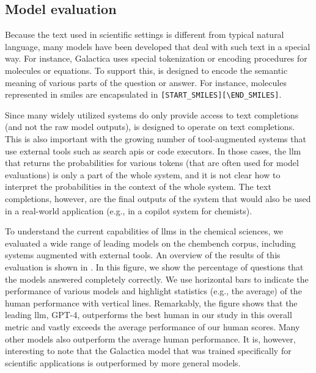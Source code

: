 \documentclass[11pt, oneside]{article}
\begin{document}
\begin{refsection}
\subsection{Model evaluation}

Because the text used in scientific settings is different from typical natural language, many models have been developed that deal with such text in a special way.
For instance, Galactica\autocite{taylor2022galactica} uses special tokenization or encoding procedures for molecules or equations.
To support this, \chembench is designed to encode the semantic meaning of various parts of the question or answer.  
For instance, molecules represented in \gls{smiles} are encapsulated in \texttt{[START\_SMILES][\textbackslash END\_SMILES]}.

Since many widely utilized systems do only provide access to text completions (and not the raw model outputs), \chembench is designed to operate on text completions.
This is also important with the growing number of tool-augmented systems that use external tools such as search \glspl{api} or code executors.\autocite{schick2024toolformer, karpas2022mrkl, yao2022react}
In those cases, the \gls{llm} that returns the probabilities for various tokens (that are often used for model evaluations\autocite{Fourrier_Habib_Launay_Wolf}) is only a part of the whole system, and it is not clear how to interpret the probabilities in the context of the whole system.
The text completions, however, are the final outputs of the system that would also be used in a real-world application (e.g., in a copilot system for chemists).

To understand the current capabilities of \glspl{llm} in the chemical sciences, we evaluated a wide range of leading models\autocite{Huggingface} on the chembench corpus, including systems augmented with external tools.
An overview of the results of this evaluation is shown in . 
In this figure, we show the percentage of questions that the models answered completely correctly.
We use horizontal bars to indicate the performance of various models and highlight statistics (e.g., the average) of the human performance with vertical lines.
Remarkably, the figure shows that the leading \gls{llm}, GPT-4, outperforms the best human in our study in this overall metric and vastly exceeds the average performance of our human scores.
Many other models also outperform the average human performance. It is, however, interesting to note that the Galactica model that was trained specifically for scientific applications is outperformed by more general models.


\end{refsection}
\end{document}
